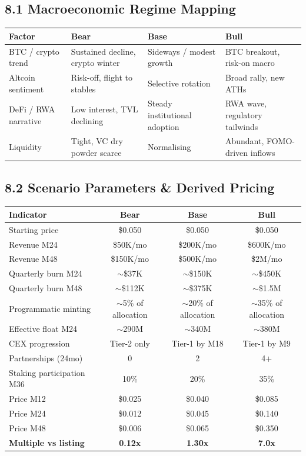 \documentclass[
  paper=a4,
  ,captions=tableheading
]{scrartcl}
\begin{document}
\subsection{8.1 Macroeconomic Regime Mapping}\label{macro-regime}

\begin{center}
\small
\begin{tabularx}{\textwidth}{p{3.2cm} Y Y Y}
\toprule
\textbf{Factor} & \textbf{Bear} & \textbf{Base} & \textbf{Bull} \\
\midrule
BTC / crypto trend & Sustained decline, crypto winter & Sideways / modest growth & BTC breakout, risk-on macro \\
Altcoin sentiment & Risk-off, flight to stables & Selective rotation & Broad rally, new ATHs \\
DeFi / RWA narrative & Low interest, TVL declining & Steady institutional adoption & RWA wave, regulatory tailwinds \\
Liquidity & Tight, VC dry powder scarce & Normalising & Abundant, FOMO-driven inflows \\
\bottomrule
\end{tabularx}
\end{center}

\subsection{8.2 Scenario Parameters \& Derived Pricing}\label{scenario-parameters}

\begin{center}
\begin{tabular}{lccc}
\toprule
\textbf{Indicator} & \textbf{Bear} & \textbf{Base} & \textbf{Bull} \\
\midrule
Starting price & \$0.050 & \$0.050 & \$0.050 \\
Revenue M24 & \$50K/mo & \$200K/mo & \$600K/mo \\
Revenue M48 & \$150K/mo & \$500K/mo & \$2M/mo \\
Quarterly burn M24 & $\sim$\$37K & $\sim$\$150K & $\sim$\$450K \\
Quarterly burn M48 & $\sim$\$112K & $\sim$\$375K & $\sim$\$1.5M \\
Programmatic minting & $\sim$5\% of allocation & $\sim$20\% of allocation & $\sim$35\% of allocation \\
Effective float M24 & $\sim$290M & $\sim$340M & $\sim$380M \\
CEX progression & Tier-2 only & Tier-1 by M18 & Tier-1 by M9 \\
Partnerships (24mo) & 0 & 2 & 4+ \\
Staking participation M36 & 10\% & 20\% & 35\% \\
\midrule
Price M12 & \$0.025 & \$0.040 & \$0.085 \\
Price M24 & \$0.012 & \$0.045 & \$0.140 \\
Price M48 & \$0.006 & \$0.065 & \$0.350 \\
\midrule
\textbf{Multiple vs listing} & \textbf{0.12x} & \textbf{1.30x} & \textbf{7.0x} \\
\bottomrule
\end{tabular}
\end{center}
\end{document}
